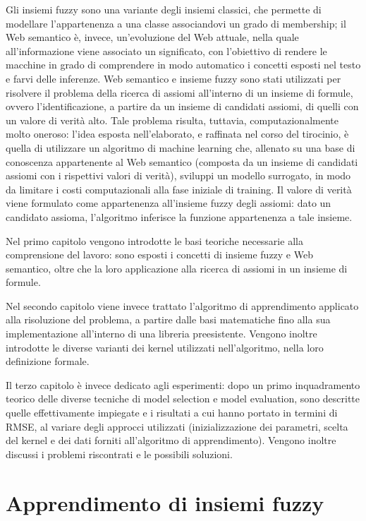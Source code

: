 \documentclass[12pt,a4paper]{report}
\begin{document}
Gli insiemi fuzzy sono una variante degli insiemi classici, che permette di modellare l'appartenenza a una classe associandovi un grado di membership; il Web semantico è, invece, un'evoluzione del Web attuale, nella quale all'informazione viene associato un significato, con l'obiettivo di rendere le macchine in grado di comprendere in modo automatico i concetti esposti nel testo e farvi delle inferenze.
Web semantico e insieme fuzzy sono stati utilizzati per risolvere il problema della ricerca di assiomi all'interno di un insieme di formule, ovvero l'identificazione, a partire da un insieme di candidati assiomi, di quelli con un valore di verità alto.
Tale problema risulta, tuttavia, computazionalmente molto oneroso: l'idea esposta nell'elaborato, e raffinata nel corso del tirocinio, è quella di utilizzare un algoritmo di machine learning che, allenato su una base di conoscenza appartenente al Web semantico (composta da un insieme di candidati assiomi con i rispettivi valori di verità), sviluppi un modello surrogato, in modo da limitare i costi computazionali alla fase iniziale di training. Il valore di verità viene formulato come appartenenza all'insieme fuzzy degli assiomi: dato un candidato assioma, l'algoritmo inferisce la funzione appartenenza a tale insieme.

Nel primo capitolo vengono introdotte le basi teoriche necessarie alla comprensione del lavoro: sono esposti i concetti di insieme fuzzy e Web semantico, oltre che la loro applicazione alla ricerca di assiomi in un insieme di formule.

Nel secondo capitolo viene invece trattato l'algoritmo di apprendimento applicato alla risoluzione del problema, a partire dalle basi matematiche fino alla sua implementazione all'interno di una libreria preesistente. Vengono inoltre introdotte le diverse varianti dei kernel utilizzati nell'algoritmo, nella loro definizione formale.

Il terzo capitolo è invece dedicato agli esperimenti: dopo un primo inquadramento teorico delle diverse tecniche di model selection e model evaluation, sono descritte quelle effettivamente impiegate e i risultati a cui hanno portato in termini di RMSE, al variare degli approcci utilizzati (inizializzazione dei parametri, scelta del kernel e dei dati forniti all'algoritmo di apprendimento). Vengono inoltre discussi i problemi riscontrati e le possibili soluzioni.


\chapter{Apprendimento di insiemi fuzzy}
\end{document}
